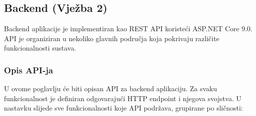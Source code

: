 \documentclass[a4paper,12pt]{article}
\begin{document}
\newpage

\subsection{Backend (Vježba 2)}

Backend aplikacije je implementiran kao REST API koristeći ASP.NET Core 9.0. API je organiziran u nekoliko glavnih područja koja pokrivaju različite funkcionalnosti sustava.

\subsubsection{Opis API-ja}

U ovome poglavlju će biti opisan API za backend aplikaciju. Za svaku funkcionalnost je definiran odgovarajući HTTP endpoint i njegova svojstva. U nastavku slijede sve funkcionalnosti koje API podržava, grupirane po sličnosti:
\end{document}
